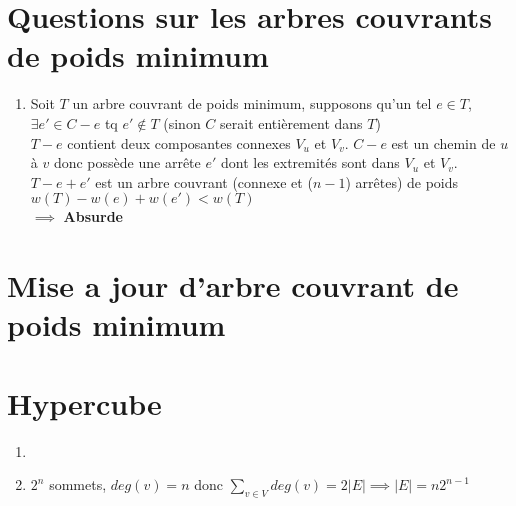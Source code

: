 \documentclass{article}
\newcommand{\image}[3]{ %
    \begin{minipage}[t]{\linewidth}
        #1
              \adjustbox{valign=t}{%
                \texttt{[image: \#3]}%
              }
    \end{minipage}}
\begin{document}
\section{Questions sur les arbres couvrants de poids minimum}

\begin{enumerate}
    \item Soit $T$ un arbre couvrant de poids minimum, supposons qu'un tel $e \in T$, \\
    $\exists e' \in C - e$ tq $e' \notin T$ (sinon $C$ serait entièrement dans $T$) \\
    $T - e$ contient deux composantes connexes $V_u$ et $V_v$.
    $C - e$ est un chemin de $u$ à $v$ donc possède une arrête $e'$ dont les extremités sont dans $V_u$ et $V_v$. \\
    $T - e + e'$ est un arbre couvrant (connexe et ($n-1$) arrêtes) de poids $w(T) - w(e) + w(e') < w(T)$ \\
    $\implies$ \textbf{Absurde}
\end{enumerate}

\section{Mise a jour d'arbre couvrant de poids minimum}

\section{Hypercube}
\begin{enumerate}
    \item
    \image{\centering}{0.7}{img/Hypercube-graphs-for-n-1-2-3.png}
    \item $2^n$ sommets, $deg(v) = n$
    donc \( \sum\limits_{v \in V} deg(v) = 2 |E| \implies |E| = n2^{n-1} \)
\end{enumerate}
\end{document}
